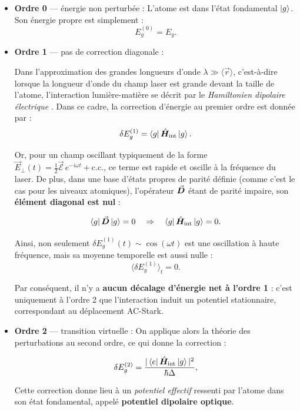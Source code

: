 \begin{itemize}[label = $\bullet$] 
\item \textbf{Ordre 0} — énergie non perturbée :  
L’atome est dans l’état fondamental \( \ket{g} \). Son énergie propre est simplement :  
\[
E_g^{(0)} = E_g.
\]

\item \textbf{Ordre 1} — pas de correction diagonale :  

Dans l’approximation des grandes longueurs d’onde \( \lambda \gg \langle \vec{r} \rangle \), c’est-à-dire lorsque la longueur d’onde du champ laser est grande devant la taille de l’atome, l’interaction lumière-matière se décrit par le \emph{Hamiltonien dipolaire électrique} . Dans ce cadre, la correction d’énergie au premier ordre est donnée par :
\[
\delta E_g^{(1)} = \bra{g} \hat{\bm{H}}_{\text{int}} \ket{g}.
\]

Or, pour un champ oscillant typiquement de la forme \( \vec{E}_{\perp}(t) = \frac{1}{2} \vec{\mathcal{E}}\, e^{-i\omega t} + \text{c.c.} \), ce terme est rapide et oscille à la fréquence du laser. De plus, dans une base d’états propres de parité définie (comme c’est le cas pour les niveaux atomiques), l’opérateur \( \vec{{\bm{D}}} \) étant de parité impaire, son \textbf{élément diagonal est nul} :

\[
\bra{g}  \vec{{\bm{D}}} \ket{g} = 0 \quad \Rightarrow \quad \bra{g} \hat{\bm{H}}_{\text{int}} \ket{g} = 0.
\]

Ainsi, non seulement \( \delta E_g^{(1)}(t) \sim \cos(\omega t) \) est une oscillation à haute fréquence, mais sa moyenne temporelle est aussi nulle :
\[
\langle \delta E_g^{(1)} \rangle_t = 0.
\]

Par conséquent, il n’y a \textbf{aucun décalage d’énergie net à l’ordre 1} : c’est uniquement à l’ordre 2 que l’interaction induit un potentiel stationnaire, correspondant au déplacement AC-Stark.


\item \textbf{Ordre 2} — transition virtuelle :  
On applique alors la théorie des perturbations au second ordre, ce qui donne la correction :

\begin{equation}
\delta E_g^{(2)} =  \frac{|\bra{e} \hat{\bm{H}}_{\text{int}} \ket{g}|^2}{\hbar \Delta},
\end{equation}

Cette correction donne lieu à un \emph{potentiel effectif} ressenti par l’atome dans son état fondamental, appelé \textbf{potentiel dipolaire optique}.
\end{itemize}


